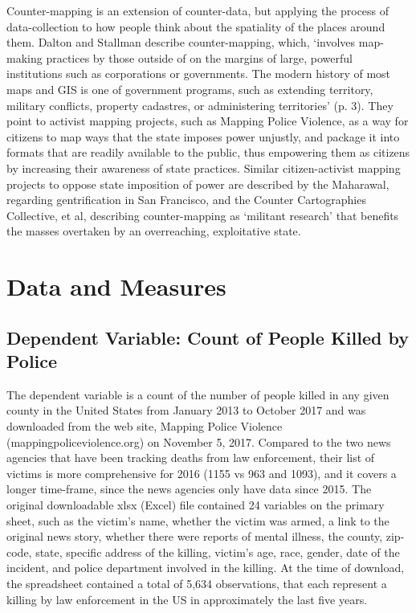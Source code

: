 \documentclass[sigconf]{acmart}
\begin{document}
Counter-mapping is an extension of counter-data, but applying the process of data-collection to how people think about the spatiality of the places around them.  Dalton and Stallman describe counter-mapping, which, `involves map-making practices by those outside of on the margins of large, powerful institutions such as corporations or governments. \cite{dalton17} The modern history of most maps and GIS is one of government programs, such as extending territory, military conflicts, property cadastres, or administering territories' (p. 3).  They point to activist mapping projects, such as Mapping Police Violence, as a way for citizens to map ways that the state imposes power unjustly, and package it into formats that are readily available to the public, thus empowering them as citizens by increasing their awareness of state practices. Similar citizen-activist mapping projects to oppose state imposition of power are described by the Maharawal, regarding gentrification in San Francisco, and  the Counter Cartographies Collective, et al, describing counter-mapping as `militant research' that benefits the masses overtaken by an overreaching, exploitative state. \cite{maharawal17,ccc12}

\section{Data and Measures}
\subsection{Dependent Variable: Count of People Killed by Police}
The dependent variable is a count of the number of people killed in any given county in the United States from January 2013 to October 2017 and was downloaded from the web site, Mapping Police Violence (mappingpoliceviolence.org) on November 5, 2017.  Compared to the two news agencies that have been tracking deaths from law enforcement, their list of victims is more comprehensive for 2016 (1155 vs 963 and 1093), and it covers a longer time-frame, since the news agencies only have data since 2015.  The original downloadable xlsx (Excel) file contained 24 variables on the primary sheet, such as the victim's name, whether the victim was armed, a link to the original news story, whether there were reports of mental illness, the county, zip-code, state, specific address of the killing, victim's age, race, gender, date of the incident, and police department involved in the killing. At the time of download, the spreadsheet contained a total of 5,634 observations, that each represent a killing by law enforcement in the US in approximately the last five years.
\end{document}

